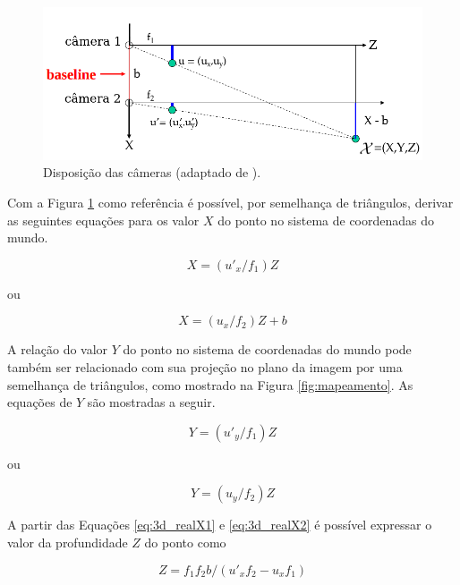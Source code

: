 {\begin{figure}[h!]
\centering
\includegraphics[width=.72\linewidth]{figs/TG_triangulation_pdf_washington_pt2.png}
\caption{Disposição das câmeras (adaptado de \cite{stereovision-washington-pdf}).}
\label{fig:disp_cameras}
\end{figure}


Com a Figura \ref{fig:disp_cameras} como referência é possível, por semelhança de triângulos, derivar as seguintes equações para os valor $X$ do ponto no sistema de coordenadas do mundo.

\begin{equation}
X = (u'_x/f_1)  Z
\label{eq:3d_realX1}
\end{equation}   

ou

\begin{equation}
X = (u_x/f_2)  Z + b
\label{eq:3d_realX2}
\end{equation}  

A relação do valor $Y$ do ponto no sistema de coordenadas do mundo pode também ser relacionado com sua projeção no plano da imagem por uma semelhança de triângulos, como mostrado na Figura \ref{fig:mapeamento}. As equações de $Y$ são mostradas a seguir.

\begin{equation}
Y = (u'_y/f_1) Z
\label{eq:3d_realY1}
\end{equation}      

ou

\begin{equation}
Y = (u_y/f_2) Z
\label{eq:3d_realY2}
\end{equation}  


A partir das Equações \ref{eq:3d_realX1} e \ref{eq:3d_realX2} é possível expressar o valor da profundidade $Z$ do ponto como

\begin{equation}
Z = f_1  f_2  b / (u'_x  f_2 - u_x  f_1)
\label{eq:3d_Zequation}
\end{equation}


}
